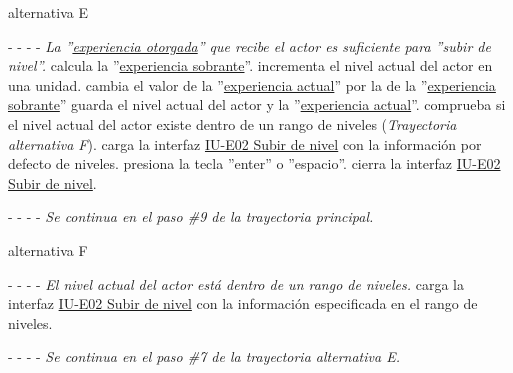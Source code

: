 \begin{UCtrayectoria}{alternativa E}
    \item[- -] - - {\em La ''\hyperref[table:METerminosExperiencia1]{experiencia otorgada}'' que recibe el actor es suficiente para ''subir de nivel''.}
    \sistema calcula la ''\hyperref[table:METerminosExperiencia2]{experiencia sobrante}''.
    \sistema incrementa el nivel actual del actor en una unidad.
    \sistema cambia el valor de la ''\hyperref[table:METerminosExperiencia1]{experiencia actual}'' por la de la ''\hyperref[table:METerminosExperiencia1]{experiencia sobrante}''
    \sistema guarda el nivel actual del actor y la ''\hyperref[table:METerminosExperiencia1]{experiencia actual}''.
    \sistema comprueba si el nivel actual del actor existe dentro de un rango de niveles ({\it Trayectoria alternativa F}). 
    \sistema carga la interfaz \hyperref[IUE02]{IU-E02 Subir de nivel} con la información por defecto de niveles.
    \actor presiona la tecla ''enter'' o ''espacio''.
    \sistema cierra la interfaz \hyperref[IUE02]{IU-E02 Subir de nivel}.
    \item[- -] - - {\em Se continua en el paso \#9 de la trayectoria principal.}
\end{UCtrayectoria}


\begin{UCtrayectoria}{alternativa F}
    \item[- -] - - {\em El nivel actual del actor está dentro de un rango de niveles.}
    \sistema carga la interfaz \hyperref[IUE02]{IU-E02 Subir de nivel}  con la información especificada en el rango de niveles.
    \item[- -] - - {\em Se continua en el paso \#7 de la trayectoria alternativa E.}
\end{UCtrayectoria}

\vfill\clearpage